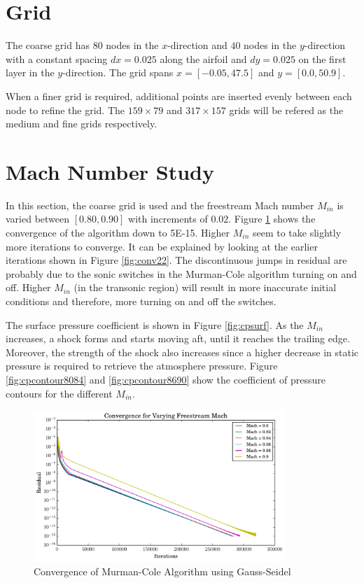 \documentclass[letterpaper,12pt,]{article}
\begin{document}



\section*{Grid}

The coarse grid has $80$ nodes in the $x$-direction and $40$ nodes in the $y$-direction with a constant spacing $dx = 0.025$ along the airfoil and $dy=0.025$ on the first layer in the $y$-direction.
The grid spans $x=[-0.05, 47.5]$ and $y=[0.0, 50.9]$.

When a finer grid is required, additional points are inserted evenly between each node to refine the grid.
The $159 \times 79$ and $317 \times 157$ grids will be refered as the medium and fine grids respectively.

\section*{Mach Number Study}

In this section, the coarse grid is used and the freestream Mach number $M_{in}$ is varied between $[0.80,0.90]$ with increments of $0.02$.
Figure \ref{fig:conv2} shows the convergence of the algorithm down to 5\textsc{E-}15.
Higher $M_{in}$ seem to take slightly more iterations to converge.
It can be explained by looking at the earlier iterations shown in Figure \ref{fig:conv22}.
The discontinuous jumps in residual are probably due to the sonic switches in the Murman-Cole algorithm turning on and off.
Higher $M_{in}$ (in the transonic region) will result in more inaccurate initial conditions and therefore, more turning on and off the switches.

The surface pressure coefficient is shown in Figure \ref{fig:cpsurf}.
As the $M_{in}$ increases, a shock forms and starts moving aft, until it reaches the trailing edge.
Moreover, the strength of the shock also increases since a higher decrease in static pressure is required to retrieve the atmosphere pressure.
Figure \ref{fig:cpcontour8084} and \ref{fig:cpcontour8690} show the coefficient of pressure contours for the different $M_{in}$.

\begin{figure}[!htbp]
    \centering
    \includegraphics[width = 0.85\textwidth]{./Figures/convergenceq2.pdf}
    \caption {Convergence of Murman-Cole Algorithm using Gauss-Seidel}
    \label{fig:conv2}
\end{figure}
\end{document}
